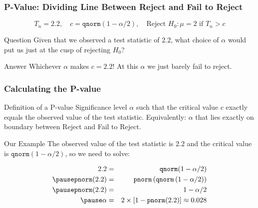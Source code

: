 \begin{frame}
  \frametitle{P-Value: Dividing Line Between Reject and Fail to Reject}

  \vspace{-2em}

  \[\boxed{T_n = 2.2, \quad c = \texttt{qnorm}(1 -\alpha/2), \quad \mbox{Reject } H_0\colon \mu = 2 \mbox{ if } T_n > c}\]

  \begin{block}{Question}
    Given that we observed a test statistic of $2.2$, what choice of $\alpha$ would put us \alert{just at the cusp} of rejecting $H_0$? 
  \end{block}

  \pause

  \begin{alertblock}{Answer}
    Whichever $\alpha$ makes $c = 2.2$!
    At this $\alpha$ we just \alert{barely} fail to reject.
  \end{alertblock}


\end{frame}
\begin{frame}
  \frametitle{Calculating the P-value}

  \begin{block}{Definition of a P-value}
    Significance level $\alpha$ such that the critical value $c$ \alert{exactly equals} the observed value of the test statistic. 
    Equivalently: $\alpha$ that lies exactly on boundary between Reject and Fail to Reject.
  \end{block}

  \pause

  \begin{block}{Our Example}
    The observed value of the test statistic is $2.2$ and the critical value is $\texttt{qnorm}(1 - \alpha/2)$, so we need to solve:

    \vspace{-2em}

    \small
    \begin{eqnarray*}
      2.2 &=&  \texttt{qnorm}(1 - \alpha/2)\\ \pause
      \texttt{pnorm}(2.2) &=&  \texttt{pnorm}\left( \texttt{qnorm}\left( 1 - \alpha/2 \right) \right) \\ \pause
      \texttt{pnorm}(2.2) &=&  1 - \alpha/2\\ \pause
      \alpha &=& 2 \times \left[ 1 - \texttt{pnorm}(2.2) \right] \approx 0.028
    \end{eqnarray*}
  \end{block}



\end{frame}
